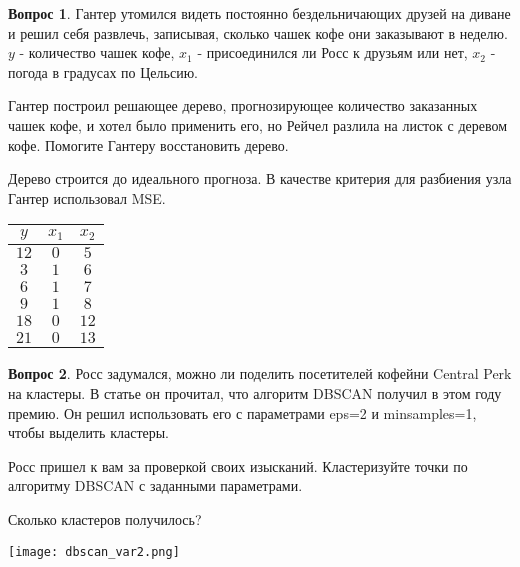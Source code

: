 \documentclass[12pt]{article}
\theoremstyle{definition}
\newtheorem{question}{Вопрос}
\begin{document}
\begin{question}
Гантер утомился видеть постоянно бездельничающих друзей на диване и решил себя развлечь, записывая, сколько чашек кофе они заказывают в неделю. $y$  - количество чашек кофе, $x_1$ - присоединился ли Росс к друзьям или нет,   $x_2$ - погода в градусах по Цельсию.

Гантер построил решающее дерево, прогнозирующее количество заказанных чашек кофе, и хотел было применить его, но Рейчел разлила на листок с деревом кофе. Помогите Гантеру восстановить дерево.
 
 Дерево строится до идеального прогноза. В качестве критерия для разбиения узла Гантер использовал MSE.

\begin{center}
    \begin{tabular}{ccc}
        \toprule
        $y$ & $x_1$ & $x_2$ \\
        \midrule
        $12$ & $0$ & $5$ \\
        $3$ & $1$ & $6$ \\
        $6$ & $1$ & $7$ \\
        $9$ & $1$ & $8$\\
        $18$ & $0$ & $12$ \\
        $21$ & $0$ & $13$ \\
        \bottomrule
    \end{tabular}
\end{center}
\end{question}


\newpage 

\begin{question}
Росс задумался, можно ли поделить посетителей кофейни Central Perk на кластеры. В статье он прочитал, что алгоритм DBSCAN получил в этом году премию. Он решил использовать его с параметрами eps=2 и minsamples=1, чтобы выделить кластеры.

Росс пришел к вам за проверкой своих изысканий. Кластеризуйте точки по алгоритму DBSCAN с заданными параметрами.

Сколько кластеров получилось?
\begin{center}
    \texttt{[image: dbscan\_var2.png]}
\end{center}

\end{question}
\end{document}

